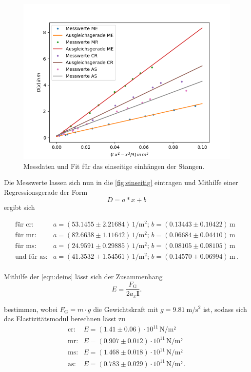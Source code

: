 \begin{figure}[H]
	\centering
	\includegraphics{Daten/AS1.png}
	\caption{Messdaten und Fit für das einseitige einhängen der Stangen.}
	\label{fig:einseitig}
\end{figure}

\noindent
Die Messwerte lassen sich nun in die \autoref{fig:einseitig} eintragen und Mithilfe einer Regressionsgerade der Form $$ D = a*x + b$$ ergibt sich

\begin{align*}
    \text{für cr}:& a = (53.1455 \pm 2.21684) \, \si{1\per\meter^2} ; \, b = (0.13443\pm 0.10422) \, \si{\meter}  \\
    \text{für mr}:& a = (82.6638 \pm 1.11642 ) \, \si{1\per\meter^2} ;\, b = (0.06684\pm 0.04410) \, \si{\meter}  \\
    \text{für ms}:& a = (24.9591 \pm 0.29885) \, \si{1\per\meter^2} ; \, b = (0.08105\pm 0.08105) \, \si{\meter}  \\
\text{und für as}:& a = (41.3532 \pm 1.54561) \, \si{1\per\meter^2} ;\,  b = (0.14570\pm 0.06994) \, \si{\meter} \, .\\
\end{align*} 

\noindent
Mithilfe der \autoref{eqn:deins} lässt sich der Zusammenhang
\begin{equation*}
    E = \frac{F_\text{G}}{2a_x\symbf{I}}.
\end{equation*}

\noindent
bestimmen, wobei $F_\text{G}= m \cdot g$ die Gewichtskraft mit $g = \SI{9.81}{\meter\per\second\squared}$ ist, sodass sich das Elastizitätsmodul berechnen lässt zu 
\begin{align*}
    \text{cr}:& E = (1.41 \pm 0.06  ) \cdot 10^{11} \, \si{\newton\per\meter²}\\
    \text{mr}:& E = (0.907 \pm 0.012) \cdot 10^{11} \, \si{\newton\per\meter²}\\
    \text{ms}:& E = (1.468 \pm 0.018) \cdot 10^{11} \, \si{\newton\per\meter²}\\
    \text{as}:& E = (0.783\pm 0.029 ) \cdot 10^{11} \, \si{\newton\per\meter²} \, .\\
\end{align*} 

